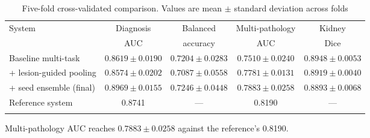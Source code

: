 \documentclass[pdflatex,sn-mathphys-num]{sn-jnl}
\theoremstyle{thmstyleone}%
\theoremstyle{thmstyletwo}%
\theoremstyle{thmstylethree}%
\begin{document}
\begin{table}[h]
\caption{Five-fold cross-validated comparison. Values are mean $\pm$ standard deviation across
folds}\label{tab:crossval}%
\begin{tabular*}{\textwidth}{@{\extracolsep\fill}lcccc}
\toprule
System & Diagnosis & Balanced & Multi-pathology & Kidney \\
       & AUC       & accuracy & AUC             & Dice \\
\midrule
Baseline multi-task          & $0.8619 \pm 0.0190$ & $0.7204 \pm 0.0283$
                             & $0.7510 \pm 0.0240$ & $\mathbf{0.8948 \pm 0.0053}$ \\
\quad + lesion-guided pooling & $0.8574 \pm 0.0202$ & $0.7087 \pm 0.0558$
                             & $0.7781 \pm 0.0131$ & $0.8919 \pm 0.0040$ \\
\quad + seed ensemble (final) & $\mathbf{0.8969 \pm 0.0155}$ & $\mathbf{0.7246 \pm 0.0448}$
                             & $\mathbf{0.7883 \pm 0.0258}$ & $0.8893 \pm 0.0068$ \\
\midrule
Reference system \cite{bib_uricads} & 0.8741 & --- & 0.8190 & --- \\
\botrule
\end{tabular*}
\end{table}

Multi-pathology AUC reaches $0.7883 \pm 0.0258$ against the reference's 0.8190.

\end{document}
